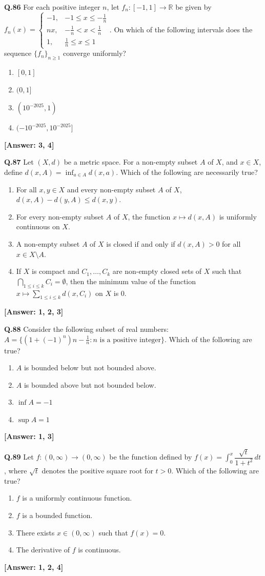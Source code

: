 \documentclass[12pt,a4paper]{article}
\newcommand{\ans}[1]{\quad\textcolor{anscolor}{\textbf{[Answer: #1]}}}
\begin{document}
\textbf{Q.86} For each positive integer $n$, let $f_n:[-1,1]\to\mathbb{R}$ be given by $f_n(x)=\begin{cases}-1,&-1\le x\le-\tfrac{1}{n}\\nx,&-\tfrac{1}{n}<x<\tfrac{1}{n}\\1,&\tfrac{1}{n}\le x\le1\end{cases}$. On which of the following intervals does the sequence $\{f_n\}_{n\ge1}$ converge uniformly?
\begin{enumerate}[label=\arabic*.]
\item $[0,1]$ \item $(0,1]$ \item $(10^{-2025},1)$ \item $(-10^{-2025},10^{-2025}]$
\end{enumerate}\ans{3, 4}

\textbf{Q.87} Let $(X,d)$ be a metric space. For a non-empty subset $A$ of $X$, and $x\in X$, define $d(x,A)=\inf_{a\in A}d(x,a)$. Which of the following are necessarily true?
\begin{enumerate}[label=\arabic*.]
\item For all $x,y\in X$ and every non-empty subset $A$ of $X$, $d(x,A)-d(y,A)\le d(x,y)$.
\item For every non-empty subset $A$ of $X$, the function $x\mapsto d(x,A)$ is uniformly continuous on $X$.
\item A non-empty subset $A$ of $X$ is closed if and only if $d(x,A)>0$ for all $x\in X\setminus A$.
\item If $X$ is compact and $C_1,\ldots,C_k$ are non-empty closed sets of $X$ such that $\bigcap_{1\le i\le k}C_i=\emptyset$, then the minimum value of the function $x\mapsto\sum_{1\le i\le k}d(x,C_i)$ on $X$ is 0.
\end{enumerate}\ans{1, 2, 3}

\textbf{Q.88} Consider the following subset of real numbers: $A=\bigl\{(1+(-1)^n)n-\tfrac{1}{n}:n\text{ is a positive integer}\bigr\}$. Which of the following are true?
\begin{enumerate}[label=\arabic*.]
\item $A$ is bounded below but not bounded above.
\item $A$ is bounded above but not bounded below.
\item $\inf A=-1$ \item $\sup A=1$
\end{enumerate}\ans{1, 3}

\textbf{Q.89} Let $f:(0,\infty)\to(0,\infty)$ be the function defined by $f(x)=\int_0^x\dfrac{\sqrt{t}}{1+t^2}\,dt$, where $\sqrt{t}$ denotes the positive square root for $t>0$. Which of the following are true?
\begin{enumerate}[label=\arabic*.]
\item $f$ is a uniformly continuous function. \item $f$ is a bounded function.
\item There exists $x\in(0,\infty)$ such that $f(x)=0$. \item The derivative of $f$ is continuous.
\end{enumerate}\ans{1, 2, 4}
\end{document}

